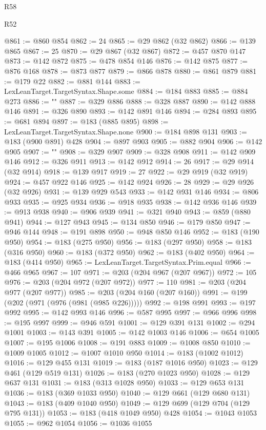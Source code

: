 \begin{lexlean}{R58}
\begin{lexlean}{R52}
\begin{coremodule}
{{{{{{{{{{{{{{{{{{{{{{{{{{{{{{{{{{{{{{{{{{{{{{{{{{{{{{{{{{{{{{{{{{{{{{{{{{{{{{{{{{{{{{{{{{{{{{{{{{{{{{{{{{{{{{{{{{{{{{{{{{{{{{{{{{{{{{{{{{{{{{{{{{{{{{{{{{{{{{{{{{{{{{{{{{{{{{{{{{{{{{{{{{{{{{{{{{{{{{@861 := @860 @854
@862 := 24
@865 := @29 @862 (@32 @862)
@866 := @139 @865
@867 := 25
@870 := @29 @867 (@32 @867)
@872 := @457 @870 @147
@873 := @142 @872
@875 := @478 @854 @146
@876 := @142 @875
@877 := @876 @168
@878 := @873 @877
@879 := @866 @878
@880 := @861 @879
@881 := @179 @22
@882 := @881 @144
@883 := LexLeanTarget.TargetSyntax.Shape.some
@884 := @184 @883
@885 := @884 @273
@886 := "{"
@887 := @329 @886
@888 := @328 @887
@890 := @142 @888 @146
@891 := @326 @890
@893 := @142 @891 @146
@894 := @284 @893
@895 := @681 @894
@897 := @183 (@885 @895)
@898 := LexLeanTarget.TargetSyntax.Shape.none
@900 := @184 @898 @131
@903 := @183 (@900 @891) @428
@904 := @897 @903
@905 := @882 @904
@906 := @142 @905
@907 := "}"
@908 := @329 @907
@909 := @328 @908
@911 := @142 @909 @146
@912 := @326 @911
@913 := @142 @912
@914 := 26
@917 := @29 @914 (@32 @914)
@918 := @139 @917
@919 := 27
@922 := @29 @919 (@32 @919)
@924 := @457 @922 @146
@925 := @142 @924
@926 := 28
@929 := @29 @926 (@32 @926)
@931 := @139 @929 @543
@933 := @142 @931 @146
@934 := @806 @933
@935 := @925 @934
@936 := @918 @935
@938 := @142 @936 @146
@939 := @913 @938
@940 := @906 @939
@941 := @321 @940
@943 := @859 (@880 @941)
@944 := @127 @943
@945 := @134 @850
@946 := @179 @850
@947 := @946 @144
@948 := @191 @898
@950 := @948 @850 @146
@952 := @183 (@190 @950)
@954 := @183 (@275 @950)
@956 := @183 (@297 @950)
@958 := @183 (@316 @950)
@960 := @183 (@372 @950)
@962 := @183 (@402 @950)
@964 := @183 (@414 @950)
@965 := LexLeanTarget.TargetSyntax.Prim.equal
@966 := @466 @965
@967 := 107
@971 := @203 (@204 @967 (@207 @967))
@972 := 105
@976 := @203 (@204 @972 (@207 @972))
@977 := 110
@981 := @203 (@204 @977 (@207 @977))
@985 := @203 (@204 @160 (@207 @160))
@991 := @199 (@202 (@971 (@976 (@981 (@985 @226)))))
@992 := @198 @991
@993 := @197 @992
@995 := @142 @993 @146
@996 := @587 @995
@997 := @966 @996
@998 := @195 @997
@999 := @946 @591
@1001 := @129 @391 @131
@1002 := @294 @1001
@1003 := @143 @391
@1005 := @142 @1003 @146
@1006 := @654 @1005
@1007 := @195 @1006
@1008 := @191 @883
@1009 := @1008 @850
@1010 := @1009 @1005
@1012 := @1007 @1010 @950
@1014 := @183 (@1002 @1012)
@1016 := @129 @455 @131
@1019 := @183 (@187 @1016 @950)
@1023 := @129 @461 (@129 @519 @131)
@1026 := @183 (@270 @1023 @950)
@1028 := @129 @637 @131
@1031 := @183 (@313 @1028 @950)
@1033 := @129 @653 @131
@1036 := @183 (@369 @1033 @950)
@1040 := @129 @661 (@129 @680 @131)
@1043 := @183 (@409 @1040 @950)
@1049 := @129 @699 (@129 @704 (@129 @795 @131))
@1053 := @183 (@418 @1049 @950) @428
@1054 := @1043 @1053
@1055 := @962 @1054
@1056 := @1036 @1055
}}}}}}}}}}}}}}}}}}}}}}}}}}}}}}}}}}}}}}}}}}}}}}}}}}}}}}}}}}}}}}}}}}}}}}}}}}}}}}}}}}}}}}}}}}}}}}}}}}}}}}}}}}}}}}}}}}}}}}}}}}}}}}}}}}}}}}}}}}}}}}}}}}}}}}}}}}}}}}}}}}}}}}}}}}}}}}}}}}}}}}}}}}}}}}}}}}}}}}
\end{coremodule}
\end{lexlean}
\end{lexlean}
